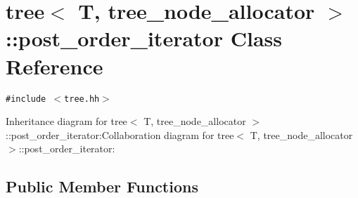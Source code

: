 \hypertarget{classtree_1_1post__order__iterator}{
\section{tree$<$ T, tree\_\-node\_\-allocator $>$::post\_\-order\_\-iterator Class Reference}
\label{classtree_1_1post__order__iterator}
}
{\tt \#include $<$tree.hh$>$}

Inheritance diagram for tree$<$ T, tree\_\-node\_\-allocator $>$::post\_\-order\_\-iterator:Collaboration diagram for tree$<$ T, tree\_\-node\_\-allocator $>$::post\_\-order\_\-iterator:\subsection*{Public Member Functions}
